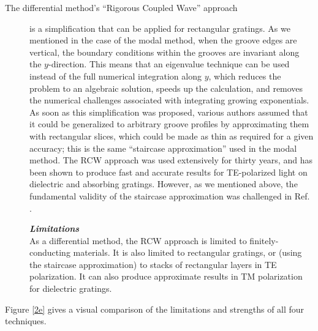 \begin{description}
\item[The differential method's ``Rigorous Coupled Wave'' approach] is a simplification that can be applied for rectangular gratings.  As we mentioned in the case of the modal method, when the groove edges are vertical, the boundary conditions within the grooves are invariant along the $y$-direction.  This means that an eigenvalue technique can be used instead of the full numerical integration along $y$, which reduces the problem to an algebraic solution, speeds up the calculation, and removes the numerical challenges associated with integrating growing exponentials.  As soon as this simplification was proposed, various authors \cite{Bur66} \cite{Pen75} \cite{Moh81} assumed that it could be generalized to arbitrary groove profiles by approximating them with rectangular slices, which could be made as thin as required for a given accuracy; this is the same ``staircase approximation'' used in the modal method.  The RCW approach was used extensively for thirty years, and has been shown to produce fast and accurate results for TE-polarized light on dielectric and absorbing gratings.  However, as we mentioned above, the fundamental validity of the staircase approximation was challenged in Ref. \cite{Pop02}.

\noindent\textbf{\emph{Limitations}}\\
As a differential method, the RCW approach is limited to finitely-conducting materials.  It is also limited to rectangular gratings, or (using the staircase approximation) to stacks of rectangular layers in TE polarization.  It can also produce approximate results in TM polarization for dielectric gratings.
\end{description}

Figure \ref{2e} gives a visual comparison of the limitations and strengths of all four techniques.

